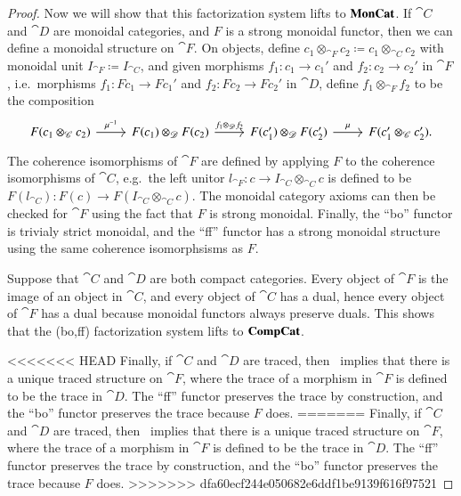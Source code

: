 \documentclass[12pt,oneside,article,draft]{memoir}
\begin{document}
\begin{enumerate}
\begin{proof}
	Now we will show that this factorization system lifts to $\mathbf{MonCat}$.
	If $\cat{C}$ and $\cat{D}$ are monoidal categories, and $F$ is a strong monoidal functor, then we can define a monoidal structure on $\cat{F}$.
	On objects, define $c_1\otimes_{\cat{F}}c_2\coloneqq c_1\otimes_{\cat{C}}c_2$ with monoidal unit $I_{\cat{F}}\coloneqq I_{\cat{C}}$, and given morphisms $f_1\colon c_1\to c_1'$ and $f_2\colon c_2\to c_2'$ in $\cat{F}$, i.e.~morphisms $f_1\colon Fc_1\to Fc_1'$ and $f_2\colon Fc_2\to Fc_2'$ in $\cat{D}$, define $f_1\otimes_{\cat{F}}f_2$ to be the composition
	\[
	\begin{tikzcd}
		F(c_1\otimes_{\cat{C}}c_2) \ar[r,"\mu^{-1}"] & F(c_1)\otimes_{\cat{D}}F(c_2) \ar[r,"f_1\otimes_{\cat{D}}f_2"] & F(c_1')\otimes_{\cat{D}}F(c_2') \ar[r,"\mu"] & F(c_1'\otimes_{\cat{C}}c_2').
	\end{tikzcd}
	\]
	The coherence isomorphisms of $\cat{F}$ are defined by applying $F$ to the coherence isomorphisms of $\cat{C}$, e.g.~the left unitor $l_{\cat{F}}\colon c\to I_{\cat{C}}\otimes_{\cat{C}}c$ is defined to be $F(l_{\cat{C}})\colon F(c)\to F(I_{\cat{C}}\otimes_{\cat{C}}c)$.
	The monoidal category axioms can then be checked for $\cat{F}$ using the fact that $F$ is strong monoidal.
	Finally, the ``bo'' functor is trivialy strict monoidal, and the ``ff'' functor has a strong monoidal structure using the same coherence isomorphsisms as $F$.

	Suppose that $\cat{C}$ and $\cat{D}$ are both compact categories.
	Every object of $\cat{F}$ is the image of an object in $\cat{C}$, and every object of $\cat{C}$ has a dual, hence every object of $\cat{F}$ has a dual because monoidal functors always preserve duals.
	This shows that the (bo,ff) factorization system lifts to $\mathbf{CompCat}$.

<<<<<<< HEAD
	Finally, if $\cat{C}$ and $\cat{D}$ are traced, then~\cite[Proposition 2.4]{Joyal-Street-Vertity} implies that there is a unique traced structure on $\cat{F}$, where the trace of a morphism in $\cat{F}$ is defined to be the trace in $\cat{D}$.
	The ``ff'' functor preserves the trace by construction, and the ``bo'' functor preserves the trace because $F$ does.
=======
Finally, if $\cat{C}$ and $\cat{D}$ are traced, then~\cite[Proposition 2.4]{JoyalStreetVertity} implies that there is a unique traced structure on $\cat{F}$, where the trace of a morphism in $\cat{F}$ is defined to be the trace in $\cat{D}$. The ``ff'' functor preserves the trace by construction, and the ``bo'' functor preserves the trace because $F$ does.
>>>>>>> dfa60ecf244e050682e6ddf1be9139f616f97521
\end{proof}


\end{enumerate}
\end{document}
